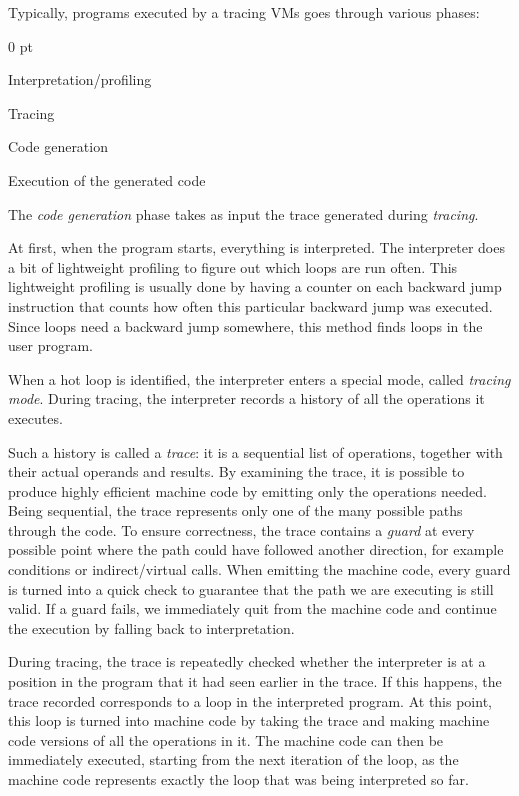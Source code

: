 \documentclass{acm_proc_article-sp}
\newenvironment{zitemize}%
   {\begin{list}{--}{
   \setlength{\itemsep}{0 pt}
   \setlength{\parsep}{0 pt}
   \setlength{\topsep} {0 pt} }}%
   {\end{list}}
\begin{document}
Typically, programs executed by a tracing VMs goes through various phases:
\vspace{-0.3cm}
\begin{zitemize}
\item Interpretation/profiling
\item Tracing
\item Code generation
\item Execution of the generated code
\end{zitemize}

The \emph{code generation} phase takes as input the trace generated during
\emph{tracing}.

At first, when the program starts, everything is interpreted.
The interpreter does a bit of lightweight profiling to figure out which loops
are run often. This lightweight profiling is usually done by having a counter on
each backward jump instruction that counts how often this particular backward jump
was executed. Since loops need a backward jump somewhere, this method finds
loops in the user program.

When a hot loop is identified, the interpreter enters a
special mode, called \emph{tracing mode}. During tracing, the interpreter
records a history of all the operations it executes.

Such a history is called a \emph{trace}: it is a sequential list of
operations, together with their actual operands and results.  By examining the
trace, it is possible to produce highly efficient machine code by emitting
only the operations needed.  Being sequential, the trace represents only one
of the many possible paths through the code. To ensure correctness, the trace
contains a \emph{guard} at every possible point where the path could have
followed another direction, for example conditions or indirect/virtual
calls.  When emitting the machine code, every guard is turned into a quick check
to guarantee that the path we are executing is still valid.  If a guard fails,
we immediately quit from the machine code and continue the execution by falling
back to interpretation.

During tracing, the trace is repeatedly
checked whether the interpreter is at a position in the program that it had seen
earlier in the trace. If this happens, the trace recorded corresponds to a loop
in the interpreted program. At this point, this loop
is turned into machine code by taking the trace and making machine code versions
of all the operations in it. The machine code can then be immediately executed,
starting from the next iteration of the loop, as the machine code represents
exactly the loop that was being interpreted so far.
\end{document}
